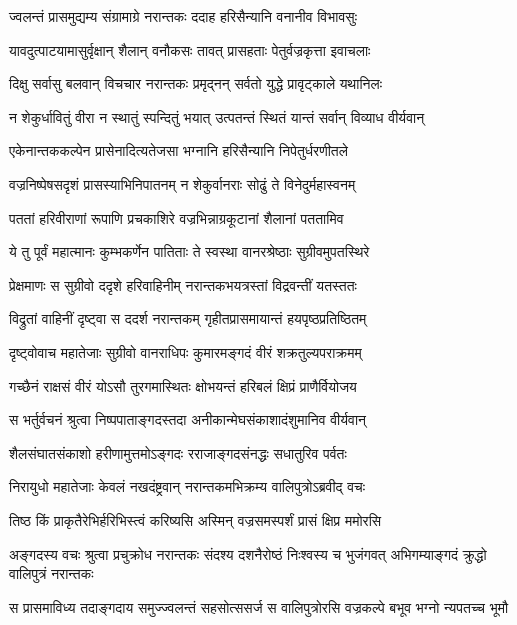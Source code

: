 \twolineshloka
{ज्वलन्तं प्रासमुद्यम्य संग्रामाग्रे नरान्तकः}
{ददाह हरिसैन्यानि वनानीव विभावसुः} %

\twolineshloka
{यावदुत्पाटयामासुर्वृक्षान् शैलान् वनौकसः}
{तावत् प्रासहताः पेतुर्वज्रकृत्ता इवाचलाः} %

\twolineshloka
{दिक्षु सर्वासु बलवान् विचचार नरान्तकः}
{प्रमृद्नन् सर्वतो युद्धे प्रावृट्काले यथानिलः} %

\twolineshloka
{न शेकुर्धावितुं वीरा न स्थातुं स्पन्दितुं भयात्}
{उत्पतन्तं स्थितं यान्तं सर्वान् विव्याध वीर्यवान्} %

\twolineshloka
{एकेनान्तककल्पेन प्रासेनादित्यतेजसा}
{भग्नानि हरिसैन्यानि निपेतुर्धरणीतले} %

\twolineshloka
{वज्रनिष्पेषसदृशं प्रासस्याभिनिपातनम्}
{न शेकुर्वानराः सोढुं ते विनेदुर्महास्वनम्} %

\twolineshloka
{पततां हरिवीराणां रूपाणि प्रचकाशिरे}
{वज्रभिन्नाग्रकूटानां शैलानां पततामिव} %

\twolineshloka
{ये तु पूर्वं महात्मानः कुम्भकर्णेन पातिताः}
{ते स्वस्था वानरश्रेष्ठाः सुग्रीवमुपतस्थिरे} %

\twolineshloka
{प्रेक्षमाणः स सुग्रीवो ददृशे हरिवाहिनीम्}
{नरान्तकभयत्रस्तां विद्रवन्तीं यतस्ततः} %

\twolineshloka
{विद्रुतां वाहिनीं दृष्ट्वा स ददर्श नरान्तकम्}
{गृहीतप्रासमायान्तं हयपृष्ठप्रतिष्ठितम्} %

\twolineshloka
{दृष्ट्वोवाच महातेजाः सुग्रीवो वानराधिपः}
{कुमारमङ्गदं वीरं शक्रतुल्यपराक्रमम्} %

\twolineshloka
{गच्छैनं राक्षसं वीरं योऽसौ तुरगमास्थितः}
{क्षोभयन्तं हरिबलं क्षिप्रं प्राणैर्वियोजय} %

\twolineshloka
{स भर्तुर्वचनं श्रुत्वा निष्पपाताङ्गदस्तदा}
{अनीकान्मेघसंकाशादंशुमानिव वीर्यवान्} %

\twolineshloka
{शैलसंघातसंकाशो हरीणामुत्तमोऽङ्गदः}
{रराजाङ्गदसंनद्धः सधातुरिव पर्वतः} %

\twolineshloka
{निरायुधो महातेजाः केवलं नखदंष्ट्रवान्}
{नरान्तकमभिक्रम्य वालिपुत्रोऽब्रवीद् वचः} %

\twolineshloka
{तिष्ठ किं प्राकृतैरेभिर्हरिभिस्त्वं करिष्यसि}
{अस्मिन् वज्रसमस्पर्शं प्रासं क्षिप्र ममोरसि} %

\threelineshloka
{अङ्गदस्य वचः श्रुत्वा प्रचुक्रोध नरान्तकः}
{संदश्य दशनैरोष्ठं निःश्वस्य च भुजंगवत्}
{अभिगम्याङ्गदं क्रुद्धो वालिपुत्रं नरान्तकः} %

\twolineshloka
{स प्रासमाविध्य तदाङ्गदाय समुज्ज्वलन्तं सहसोत्ससर्ज}
{स वालिपुत्रोरसि वज्रकल्पे बभूव भग्नो न्यपतच्च भूमौ} %

